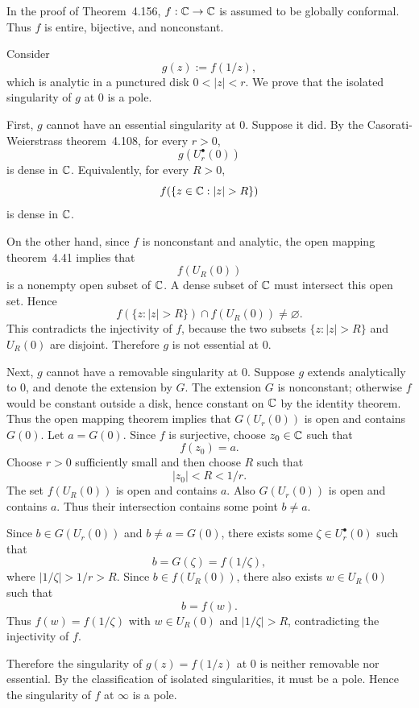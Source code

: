 \documentclass{article}
\begin{document}
\begin{solution}
  In the proof of Theorem~4.156, $f:\mathbb{C}\to\mathbb{C}$ is assumed to be globally
  conformal. Thus $f$ is entire, bijective, and nonconstant.

  Consider
  \[
    g(z):=f(1/z),
  \]
  which is analytic in a punctured disk $0<|z|<r$. We prove that the isolated
  singularity of $g$ at $0$ is a pole.

  First, $g$ cannot have an essential singularity at $0$. Suppose it did. By
  the Casorati-Weierstrass theorem~4.108, for every $r>0$,
  \[
    g(U_r^\bullet(0))
  \]
  is dense in $\mathbb{C}$. Equivalently, for every $R>0$,
  \[
    f(\{z\in\C:|z|>R\})
  \]
  is dense in $\mathbb{C}$.

  On the other hand, since $f$ is nonconstant and analytic, the open mapping
  theorem~4.41 implies that
  \[
    f(U_R(0))
  \]
  is a nonempty open subset of $\mathbb{C}$. A dense subset of $\mathbb{C}$ must intersect this
  open set. Hence
  \[
    f(\{z:|z|>R\})\cap f(U_R(0))\ne\varnothing.
  \]
  This contradicts the injectivity of $f$, because the two subsets
  $\{z:|z|>R\}$ and $U_R(0)$ are disjoint. Therefore $g$ is not essential at
  $0$.

  Next, $g$ cannot have a removable singularity at $0$. Suppose $g$ extends
  analytically to $0$, and denote the extension by $G$. The extension $G$ is
  nonconstant; otherwise $f$ would be constant outside a disk, hence constant
  on $\mathbb{C}$ by the identity theorem. Thus the open mapping theorem implies that
  $G(U_r(0))$ is open and contains $G(0)$. Let $a=G(0)$. Since $f$ is
  surjective, choose $z_0\in\mathbb{C}$ such that
  \[
    f(z_0)=a.
  \]
  Choose $r>0$ sufficiently small and then choose $R$ such that
  \[
    |z_0|<R<1/r.
  \]
  The set $f(U_R(0))$ is open and contains $a$. Also $G(U_r(0))$ is open and
  contains $a$. Thus their intersection contains some point $b\ne a$.

  Since $b\in G(U_r(0))$ and $b\ne a=G(0)$, there exists some
  $\zeta\in U_r^\bullet(0)$ such that
  \[
    b=G(\zeta)=f(1/\zeta),
  \]
  where $|1/\zeta|>1/r>R$. Since $b\in f(U_R(0))$, there also exists
  $w\in U_R(0)$ such that
  \[
    b=f(w).
  \]
  Thus $f(w)=f(1/\zeta)$ with $w\in U_R(0)$ and $|1/\zeta|>R$, contradicting
  the injectivity of $f$.

  Therefore the singularity of $g(z)=f(1/z)$ at $0$ is neither removable nor
  essential. By the classification of isolated singularities, it must be a
  pole. Hence the singularity of $f$ at $\infty$ is a pole.
\end{solution}
\end{document}
